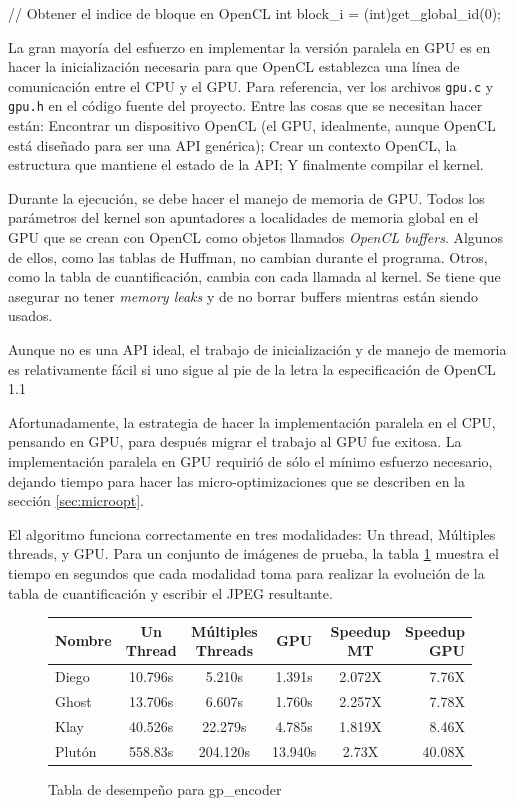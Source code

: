 \begin{code}[language=C][h]
    // Obtener el indice de bloque en OpenCL
    int block_i = (int)get_global_id(0);
\end{code}
{
La gran mayoría del esfuerzo en implementar la versión paralela en GPU es en
hacer la inicialización necesaria para que OpenCL establezca una línea de
comunicación entre el CPU y el GPU. Para referencia, ver los archivos
\verb+gpu.c+ y \verb+gpu.h+ en el código fuente del proyecto. Entre las cosas
que se necesitan hacer están: Encontrar un dispositivo OpenCL (el GPU,
idealmente, aunque OpenCL está diseñado para ser una API genérica); Crear un
contexto OpenCL, la estructura que mantiene el estado de la API; Y finalmente
compilar el kernel.

Durante la ejecución, se debe hacer el manejo de memoria de GPU. Todos los
parámetros del kernel son apuntadores a localidades de memoria global en el GPU
que se crean con OpenCL como objetos llamados \emph{OpenCL buffers}. Algunos de
ellos, como las tablas de Huffman, no cambian durante el programa. Otros, como
la tabla de cuantificación, cambia con cada llamada al kernel. Se tiene que
asegurar no tener \emph{memory leaks} y de no borrar buffers mientras están
siendo usados.

Aunque no es una API ideal, el trabajo de inicialización y de manejo de memoria
es relativamente fácil si uno sigue al pie de la letra la especificación de
OpenCL 1.1 \cite{opencl-spec}

Afortunadamente, la estrategia de hacer la implementación paralela en el CPU,
pensando en GPU, para después migrar el trabajo al GPU fue exitosa. La
implementación paralela en GPU requirió de sólo el mínimo esfuerzo necesario,
dejando tiempo para hacer las micro-optimizaciones que se describen en la
sección \ref{sec:microopt}.

El algoritmo funciona correctamente en tres modalidades: Un thread, Múltiples
threads, y GPU. Para un conjunto de imágenes de prueba, la tabla
\ref{table:perf_table_orig} muestra el tiempo en segundos que cada modalidad toma
para realizar la evolución de la tabla de cuantificación y escribir el JPEG
resultante.

\begin{figure}[h]
    \begin{tabular}{ |l c c c c r| }
        \hline
        Nombre &  Un Thread & Múltiples Threads & GPU & Speedup MT & Speedup GPU \\
        \hline
        Diego & 10.796s & 5.210s & 1.391s  & 2.072X & 7.76X \\
        Ghost & 13.706s & 6.607s & 1.760s  & 2.257X & 7.78X \\
        Klay & 40.526s & 22.279s & 4.785s  & 1.819X & 8.46X \\%
        Plutón & 558.83s & 204.120s & 13.940s & 2.73X & 40.08X \\ %
        \hline
    \end{tabular}
    \caption{Tabla de desempeño para gp\_encoder}
    \label{table:perf_table_orig}
\end{figure}

}
